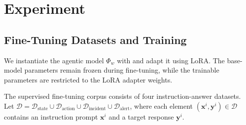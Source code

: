 \documentclass[sigconf]{acmart}
\begin{document}
%

\section{Experiment}\label{sec:experiment}

\subsection{Fine-Tuning Datasets and Training}

  We instantiate the agentic model $\Phi_w$ with
   and adapt it using LoRA. The
  base-model parameters remain frozen during fine-tuning, while the trainable
  parameters are restricted to the LoRA adapter weights.

  The supervised fine-tuning corpus consists of four instruction-answer datasets.
  Let
 $\mathcal{D}
      =
      \mathcal{D}_{\mathrm{state}}
      \cup
      \mathcal{D}_{\mathrm{action}}
      \cup
      \mathcal{D}_{\mathrm{incident}}
      \cup
      \mathcal{D}_{\mathrm{alert}}$, where each element $(\mathbf{x}^i,\mathbf{y}^i)\in\mathcal{D}$ contains an
  instruction prompt $\mathbf{x}^i$ and a target response $\mathbf{y}^i$.
\end{document}
